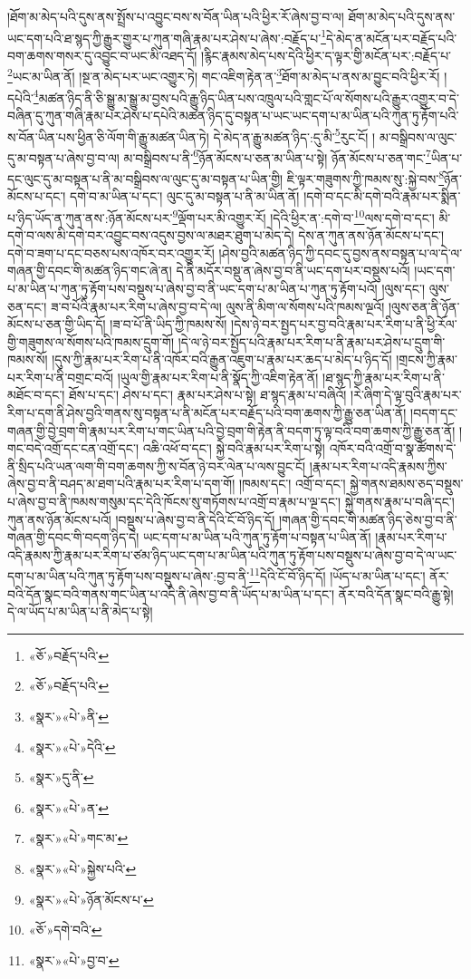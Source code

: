 །ཐོག་མ་མེད་པའི་དུས་ནས་སྤྲོས་པ་འབྱུང་བས་ས་བོན་ཡིན་པའི་ཕྱིར་རོ་ཞེས་བྱ་བ་ལ། ཐོག་མ་མེད་པའི་དུས་ནས་ཡང་དག་པའི་ཐ་སྙད་ཀྱི་རྒྱུར་གྱུར་པ་ཀུན་གཞི་རྣམ་པར་ཤེས་པ་ཞེས་:བརྗོད་པ་\footnote{«ཅོ་»བརྗོད་པའི་}དེ་མེད་ན་མངོན་པར་བརྗོད་པའི་བག་ཆགས་གསར་དུ་འབྱུང་བ་ཡང་མི་འཐད་དོ། །རྙིང་རྣམས་མེད་པས་དེའི་ཕྱིར་ད་ལྟར་གྱི་མངོན་པར་:བརྗོད་པ་\footnote{«ཅོ་»བརྗོད་པའི་}ཡང་མ་ཡིན་ནོ། །སྔ་ན་མེད་པར་ཡང་འགྱུར་ཏེ། གང་འཇིག་རྟེན་ན་\footnote{«སྣར་»«པེ་»ནི་}ཐོག་མ་མེད་པ་ནས་མ་བྱུང་བའི་ཕྱིར་རོ། །དཔེའི་\footnote{«སྣར་»«པེ་»དེའི་}མཚན་ཉིད་ནི་ཅི་སྒྱུ་མ་སྒྱུ་མ་བྱས་པའི་རྒྱུ་ཉིད་ཡིན་པས་འཁྲུལ་པའི་གླང་པོ་ལ་སོགས་པའི་རྒྱུར་འགྱུར་བ་དེ་བཞིན་དུ་ཀུན་གཞི་རྣམ་པར་ཤེས་པ་དཔེའི་མཚན་ཉིད་དུ་བསྟན་པ་ཡང་ཡང་དག་པ་མ་ཡིན་པའི་ཀུན་ཏུ་རྟོག་པའི་ས་བོན་ཡིན་པས་ཕྱིན་ཅི་ལོག་གི་རྒྱུ་མཚན་ཡིན་ཏེ། དེ་མེད་ན་རྒྱུ་མཚན་ཉིད་:དུ་མི་\footnote{«སྣར་»དུ་ནི་}རུང་ངོ། །
མ་བསྒྲིབས་ལ་ལུང་དུ་མ་བསྟན་པ་ཞེས་བྱ་བ་ལ། མ་བསྒྲིབས་པ་ནི་\footnote{«སྣར་»«པེ་»ན་}ཉོན་མོངས་པ་ཅན་མ་ཡིན་པ་སྟེ། ཉོན་མོངས་པ་ཅན་གང་\footnote{«སྣར་»«པེ་»གང་མ་}ཡིན་པ་དང་ལུང་དུ་མ་བསྟན་པ་ནི་མ་བསྒྲིབས་ལ་ལུང་དུ་མ་བསྟན་པ་ཡིན་གྱི། ཇི་ལྟར་གཟུགས་ཀྱི་ཁམས་སུ་:སྐྱེ་བས་\footnote{«སྣར་»«པེ་»སྐྱེས་པའི་}ཉོན་མོངས་པ་དང་། དགེ་བ་མ་ཡིན་པ་དང་། ལུང་དུ་མ་བསྟན་པ་ནི་མ་ཡིན་ནོ། །དགེ་བ་དང་མི་དགེ་བའི་རྣམ་པར་སྨིན་པ་ཉིད་ཡོད་ན་ཀུན་ནས་:ཉོན་མོངས་པར་\footnote{«སྣར་»«པེ་»ཉོན་མོངས་པ་}ལྡོག་པར་མི་འགྱུར་རོ། །དེའི་ཕྱིར་ན་:དགེ་བ་\footnote{«ཅོ་»དགེ་བའི་}ལས་དགེ་བ་དང་། མི་དགེ་བ་ལས་མི་དགེ་བར་འབྱུང་བས་འདུས་བྱས་ལ་མཐར་ཐུག་པ་མེད་དེ། དེས་ན་ཀུན་ནས་ཉོན་མོངས་པ་དང་། དགེ་བ་ཟག་པ་དང་བཅས་པས་འཁོར་བར་འགྱུར་རོ། །ཤེས་བྱའི་མཚན་ཉིད་ཀྱི་དབང་དུ་བྱས་ནས་བསྟན་པ་ལ་དེ་ལ་གཞན་གྱི་དབང་གི་མཚན་ཉིད་གང་ཞེ་ན། དེ་ནི་མདོར་བསྡུ་ན་ཞེས་བྱ་བ་ནི་ཡང་དག་པར་བསྡུས་པའོ། །ཡང་དག་པ་མ་ཡིན་པ་ཀུན་ཏུ་རྟོག་པས་བསྡུས་པ་ཞེས་བྱ་བ་ནི་ཡང་དག་པ་མ་ཡིན་པ་ཀུན་ཏུ་རྟོག་པའོ། །ལུས་དང་། ལུས་ཅན་དང་། ཟ་བ་པོའི་རྣམ་པར་རིག་པ་ཞེས་བྱ་བ་དེ་ལ། ལུས་ནི་མིག་ལ་སོགས་པའི་ཁམས་ལྔའོ། །ལུས་ཅན་ནི་ཉོན་མོངས་པ་ཅན་གྱི་ཡིད་དོ། །ཟ་བ་པོ་ནི་ཡིད་ཀྱི་ཁམས་སོ། །དེས་ཉེ་བར་སྤྱད་པར་བྱ་བའི་རྣམ་པར་རིག་པ་ནི་ཕྱི་རོལ་གྱི་གཟུགས་ལ་སོགས་པའི་ཁམས་དྲུག་གོ། །དེ་ལ་ཉེ་བར་སྤྱོད་པའི་རྣམ་པར་རིག་པ་ནི་རྣམ་པར་ཤེས་པ་དྲུག་གི་ཁམས་སོ། །དུས་ཀྱི་རྣམ་པར་རིག་པ་ནི་འཁོར་བའི་རྒྱུན་འཇུག་པ་རྣམ་པར་ཆད་པ་མེད་པ་ཉིད་དོ། །གྲངས་ཀྱི་རྣམ་པར་རིག་པ་ནི་བགྲང་བའོ། །ཡུལ་གྱི་རྣམ་པར་རིག་པ་ནི་སྣོད་ཀྱི་འཇིག་རྟེན་ནོ། །ཐ་སྙད་ཀྱི་རྣམ་པར་རིག་པ་ནི་མཐོང་བ་དང་། ཐོས་པ་དང་། ཤེས་པ་དང་། རྣམ་པར་ཤེས་པ་སྟེ། ཐ་སྙད་རྣམ་པ་བཞིའོ། །རེ་ཞིག་དེ་ལྟ་བུའི་རྣམ་པར་རིག་པ་དག་ནི་ཤེས་བྱའི་གནས་སུ་བསྟན་པ་ནི་མངོན་པར་བརྗོད་པའི་བག་ཆགས་ཀྱི་རྒྱུ་ཅན་ཡིན་ནོ། །བདག་དང་གཞན་གྱི་བྱེ་བྲག་གི་རྣམ་པར་རིག་པ་གང་ཡིན་པའི་བྱེ་བྲག་གི་རྟེན་ནི་བདག་ཏུ་ལྟ་བའི་བག་ཆགས་ཀྱི་རྒྱུ་ཅན་ནོ། །གང་བདེ་འགྲོ་དང་ངན་འགྲོ་དང་། འཆི་འཕོ་བ་དང་། སྐྱེ་བའི་རྣམ་པར་རིག་པ་སྟེ། འཁོར་བའི་འགྲོ་བ་སྣ་ཚོགས་དེ་ནི་སྲིད་པའི་ཡན་ལག་གི་བག་ཆགས་ཀྱི་ས་བོན་ཉེ་བར་ལེན་པ་ལས་བྱུང་ངོ། །རྣམ་པར་རིག་པ་འདི་རྣམས་ཀྱིས་ཞེས་བྱ་བ་ནི་བཤད་མ་ཐག་པའི་རྣམ་པར་རིག་པ་དག་གོ། །ཁམས་དང་། འགྲོ་བ་དང་། སྐྱེ་གནས་ཐམས་ཅད་བསྡུས་པ་ཞེས་བྱ་བ་ནི་ཁམས་གསུམ་དང་དེའི་ཁོངས་སུ་གཏོགས་པ་འགྲོ་བ་རྣམ་པ་ལྔ་དང་། སྐྱེ་གནས་རྣམ་པ་བཞི་དང་། ཀུན་ནས་ཉོན་མོངས་པའོ། །བསྡུས་པ་ཞེས་བྱ་བ་ནི་དེའི་ངོ་བོ་ཉིད་དོ། །གཞན་གྱི་དབང་གི་མཚན་ཉིད་ཅེས་བྱ་བ་ནི་གཞན་གྱི་དབང་གི་བདག་ཉིད་དེ། ཡང་དག་པ་མ་ཡིན་པའི་ཀུན་ཏུ་རྟོག་པ་བསྟན་པ་ཡིན་ནོ། །རྣམ་པར་རིག་པ་འདི་རྣམས་ཀྱི་རྣམ་པར་རིག་པ་ཙམ་ཉིད་ཡང་དག་པ་མ་ཡིན་པའི་ཀུན་ཏུ་རྟོག་པས་བསྡུས་པ་ཞེས་བྱ་བ་དེ་ལ་ཡང་དག་པ་མ་ཡིན་པའི་ཀུན་ཏུ་རྟོག་པས་བསྡུས་པ་ཞེས་:བྱ་བ་ནི་\footnote{«སྣར་»«པེ་»བྱ་བ་}དེའི་ངོ་བོ་ཉིད་དོ། །ཡོད་པ་མ་ཡིན་པ་དང་། ནོར་བའི་དོན་སྣང་བའི་གནས་གང་ཡིན་པ་འདི་ནི་ཞེས་བྱ་བ་ནི་ཡོད་པ་མ་ཡིན་པ་དང་། ནོར་བའི་དོན་སྣང་བའི་རྒྱུ་སྟེ། དེ་ལ་ཡོད་པ་མ་ཡིན་པ་ནི་མེད་པ་སྟེ། 